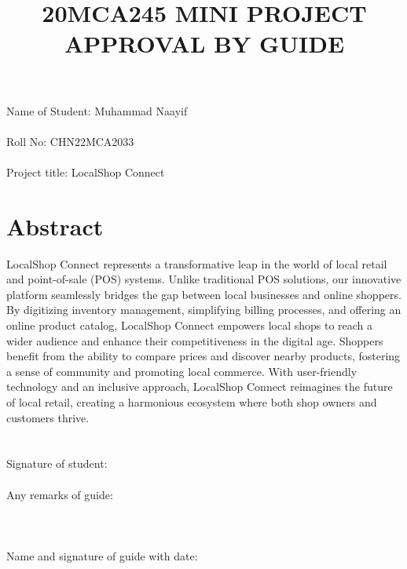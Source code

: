 \documentclass[a4paper]{article}
\title{20MCA245 MINI PROJECT\\APPROVAL BY GUIDE \vspace{-3em}}
\author{}
\date{}
\begin{document}
\maketitle
\section*{}
Name of Student: Muhammad Naayif\\\\Roll No: CHN22MCA2033\\\\Project title: LocalShop Connect

\section*{Abstract} %
LocalShop Connect represents a transformative leap in the world of local retail and point-of-sale (POS) systems. Unlike traditional POS solutions, our innovative platform seamlessly bridges the gap between local businesses and online shoppers. By digitizing inventory management, simplifying billing processes, and offering an online product catalog, LocalShop Connect empowers local shops to reach a wider audience and enhance their competitiveness in the digital age. Shoppers benefit from the ability to compare prices and discover nearby products, fostering a sense of community and promoting local commerce. With user-friendly technology and an inclusive approach, LocalShop Connect reimagines the future of local retail, creating a harmonious ecosystem where both shop owners and customers thrive.
\section*{}
Signature of student:\\\\Any remarks of guide:\\\\
\section*{}Name and signature of guide with date: 
\end{document}
